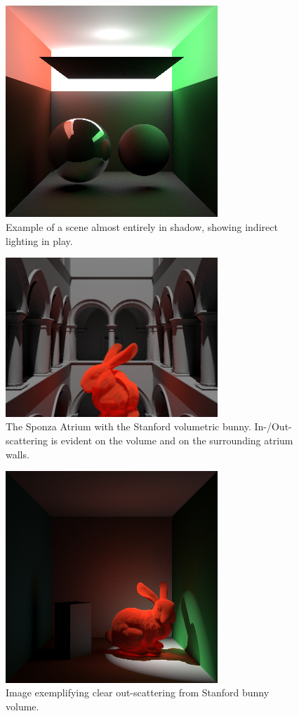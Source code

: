 \documentclass[12pt]{ucthesis}
\begin{document}
\begin{figure}[h!]
    \centering
    \includegraphics[width=80mm]{img/two_sphere_indir.png}
    \caption{Example of a scene almost entirely in shadow, showing indirect lighting in play.}
\end{figure}

\begin{figure}[h!]
    \centering
    \includegraphics[width=80mm]{img/sponza.png}
    \caption{The Sponza Atrium with the Stanford volumetric bunny.  In-/Out-scattering is evident on the volume and on the surrounding atrium walls.}
\end{figure}

\begin{figure}[h!]
    \centering
    \includegraphics[width=80mm]{img/ketchup_good_corrected.png}
    \caption{Image exemplifying clear out-scattering from Stanford bunny volume.}
\end{figure}
\end{document}
